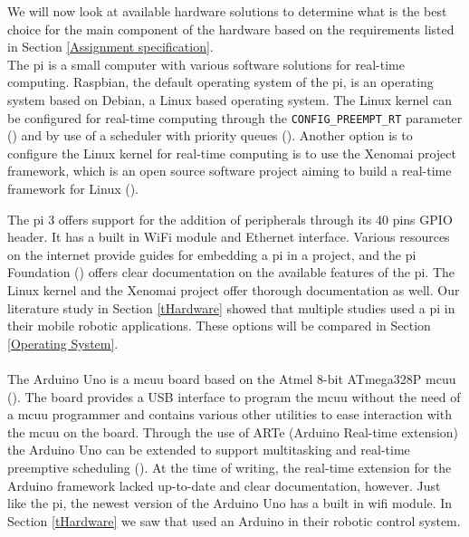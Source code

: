 \documentclass[12pt]{scrreprt}
\begin{document}
We will now look at available hardware solutions to determine what is the best choice for the main component of the hardware based on the requirements listed in Section \ref{Assignment specification}.
\\
The \gls{pi} is a small computer with various software solutions for real-time computing. Raspbian, the default operating system of the \gls{pi}, is an operating system based on Debian, a Linux based operating system. The Linux kernel can be configured for real-time computing through the \texttt{CONFIG_PREEMPT_RT} parameter (\cite{rtwiki}) and by use of a scheduler with priority queues (\cite{linux_scheduling}). Another option is to configure the Linux kernel for real-time computing is to use the Xenomai project framework, which is an open source software project aiming to build a real-time framework for Linux (\cite{xenomai}). 
\par
The \gls{pi} 3 offers support for the addition of peripherals through its 40 pins GPIO header. It has a built in WiFi module and Ethernet interface. Various resources on the internet provide guides for embedding a \gls{pi} in a project, and the \gls{pi} Foundation (\cite{foundation}) offers clear documentation on the available features of the \gls{pi}. The Linux kernel and the Xenomai project offer thorough documentation as well. Our literature study in Section \ref{tHardware} showed that multiple studies used a \gls{pi} in their mobile robotic applications. These options will be compared in Section \ref{Operating System}.
\\\\
The Arduino Uno is a \gls{mcuu} board based on the Atmel 8-bit ATmega328P \gls{mcuu} (\cite{arduinouno}). The board provides a USB interface to program the \gls{mcuu} without the need of a \gls{mcuu} programmer and contains various other utilities to ease interaction with the \gls{mcuu} on the board. Through the use of ARTe (Arduino Real-time extension) the Arduino Uno can be extended to support multitasking and real-time preemptive scheduling (\cite{ARTe}). At the time of writing,  the real-time extension for the Arduino framework lacked up-to-date and clear documentation, however. Just like the \gls{pi}, the newest version of the Arduino Uno has a built in \gls{wifi} module. In Section \ref{tHardware} we saw that \cite{arduino} used an Arduino in their robotic control system.
\\\\
\end{document}

